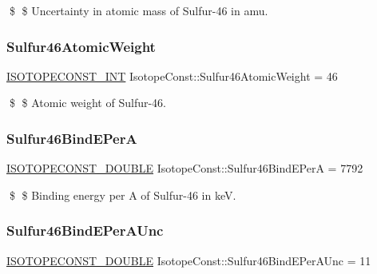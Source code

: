 \$ \$ Uncertainty in atomic mass of Sulfur-\/46 in amu. \mbox{\label{group___isotope_const-_sulfur-_s46_ga30fc029d3a81cbb272b1c1990659e835}} 
\subsubsection{\texorpdfstring{Sulfur46\+Atomic\+Weight}{Sulfur46AtomicWeight}}
{\footnotesize\ttfamily \mbox{\hyperlink{group___isotope_const-_macros_ga5f18360b3e99483a35c32d789e62621c}{I\+S\+O\+T\+O\+P\+E\+C\+O\+N\+S\+T\+\_\+\+I\+NT}} Isotope\+Const\+::\+Sulfur46\+Atomic\+Weight = 46}

\$ \$ Atomic weight of Sulfur-\/46. \mbox{\label{group___isotope_const-_sulfur-_s46_ga3ad424fc4f9b0afffaf33ec4e340941f}} 
\subsubsection{\texorpdfstring{Sulfur46\+Bind\+E\+PerA}{Sulfur46BindEPerA}}
{\footnotesize\ttfamily \mbox{\hyperlink{group___isotope_const-_macros_ga8f45a7272ce02c0b4c65c44636ed719a}{I\+S\+O\+T\+O\+P\+E\+C\+O\+N\+S\+T\+\_\+\+D\+O\+U\+B\+LE}} Isotope\+Const\+::\+Sulfur46\+Bind\+E\+PerA = 7792}

\$ \$ Binding energy per A of Sulfur-\/46 in keV. \mbox{\label{group___isotope_const-_sulfur-_s46_ga6902ce983d4f919edf377e4e79bd86af}} 
\subsubsection{\texorpdfstring{Sulfur46\+Bind\+E\+Per\+A\+Unc}{Sulfur46BindEPerAUnc}}
{\footnotesize\ttfamily \mbox{\hyperlink{group___isotope_const-_macros_ga8f45a7272ce02c0b4c65c44636ed719a}{I\+S\+O\+T\+O\+P\+E\+C\+O\+N\+S\+T\+\_\+\+D\+O\+U\+B\+LE}} Isotope\+Const\+::\+Sulfur46\+Bind\+E\+Per\+A\+Unc = 11}

